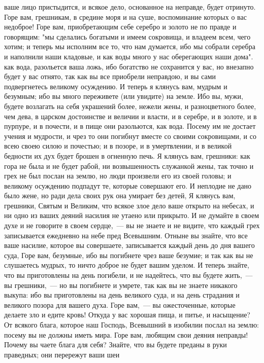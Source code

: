 ваше лицо пристыдится, и всякое дело, основанное на неправде, будет отринуто.
Горе вам, грешникам, в средине моря и на суше, воспоминание которых о вас
недоброе!
Горе вам, приобретающим себе серебро и золото не по правде и
говорящим: "мы сделались богатыми и имеем сокровища, и владеем всем, чего
хотим; и теперь мы исполним все то, что нам думается, ибо мы собрали серебра и
наполнили наши кладовые, и как воды много у нас оберегающих наши дома".
как вода, разольется ваша ложь, ибо богатство не сохранится у вас, но
внезапно будет у вас отнято, так как вы все приобрели неправдою, и вы сами
подвергнетесь великому осуждению.
И теперь я клянусь вам, мудрым и безумным; ибо вы много
переживете (или увидите) на земле.
Ибо вы, мужи, будете возлагать на себя украшений более, нежели жены, и
разноцветного более, чем дева, в царском достоинстве и величии и власти, и в
серебре, и в золоте, и в пурпуре, и в почести, и в пище они разольются, как
вода.
Посему им не достает учения и мудрости, и чрез то они погибнут вместе
со своими сокровищами, и со всею своею силою и почестью; и в позоре, и в
умертвлении, и в великой бедности их дух будет брошен в огненную печь.
Я клянусь вам, грешники: как гора не была и не будет рабой, ни
возвышенность служанкой жены, так точно и грех не был послан на землю, но люди
произвели его из своей головы; и великому осуждению подпадут те, которые
совершают его.
И неплодие не дано было жене, но ради дела своих рук она умирает без
детей, Я клянусь вам, грешники, Святым и Великим, что всякое злое дело ваше
открыто на небесах, и ни одно из ваших деяний насилия не утаено или прикрыто.
И не думайте в своем духе и не говорите в своем сердце,~--- вы не знаете
и не видите, что каждый грех записывается ежедневно на небе пред Всевышним.
Отныне вы знайте, что все ваше насилие, которое вы совершаете,
записывается каждый день до дня вашего суда, Горе вам, безумные, ибо вы
погибнете чрез ваше безумие; и так как вы не слушаетесь мудрых, то ничто доброе
не будет вашим уделом.
И теперь знайте, что вы приготовлены на день погибели, и не надейтесь,
что вы будете жить,~--- вы грешники,~--- но вы погибнете и умрете, так как вы не
знаете никакого выкупа: ибо вы приготовлены на день великого суда, и на день
страдания и великого позора для вашего духа.
Горе вам,~--- вы ожесточенные, которые делаете зло и едите кровь!
Откуда у вас хорошая пища, и питье, и насыщение?
От всякого блага, которое наш Господь, Всевышний в изобилии послал на
землю: посему вы не должны иметь мира.
Горе вам, любящим свои деяния неправды!
Почему вы чаете блага для себя?
Знайте, что вы будете преданы в руки праведных; они перережут ваши шеи
